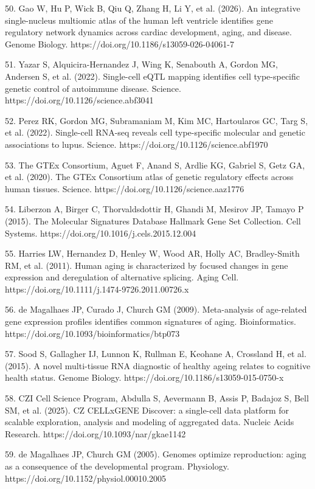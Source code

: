 \documentclass[11pt]{article}
\begin{document}
50. Gao W, Hu P, Wick B, Qiu Q, Zhang H, Li Y, et al. (2026). An integrative single-nucleus multiomic atlas of the human left ventricle identifies gene regulatory network dynamics across cardiac development, aging, and disease. Genome Biology. https://doi.org/10.1186/s13059-026-04061-7

51. Yazar S, Alquicira-Hernandez J, Wing K, Senabouth A, Gordon MG, Andersen S, et al. (2022). Single-cell eQTL mapping identifies cell type-specific genetic control of autoimmune disease. Science. https://doi.org/10.1126/science.abf3041

52. Perez RK, Gordon MG, Subramaniam M, Kim MC, Hartoularos GC, Targ S, et al. (2022). Single-cell RNA-seq reveals cell type-specific molecular and genetic associations to lupus. Science. https://doi.org/10.1126/science.abf1970

53. The GTEx Consortium, Aguet F, Anand S, Ardlie KG, Gabriel S, Getz GA, et al. (2020). The GTEx Consortium atlas of genetic regulatory effects across human tissues. Science. https://doi.org/10.1126/science.aaz1776

54. Liberzon A, Birger C, Thorvaldsdottir H, Ghandi M, Mesirov JP, Tamayo P (2015). The Molecular Signatures Database Hallmark Gene Set Collection. Cell Systems. https://doi.org/10.1016/j.cels.2015.12.004

55. Harries LW, Hernandez D, Henley W, Wood AR, Holly AC, Bradley-Smith RM, et al. (2011). Human aging is characterized by focused changes in gene expression and deregulation of alternative splicing. Aging Cell. https://doi.org/10.1111/j.1474-9726.2011.00726.x

56. de Magalhaes JP, Curado J, Church GM (2009). Meta-analysis of age-related gene expression profiles identifies common signatures of aging. Bioinformatics. https://doi.org/10.1093/bioinformatics/btp073

57. Sood S, Gallagher IJ, Lunnon K, Rullman E, Keohane A, Crossland H, et al. (2015). A novel multi-tissue RNA diagnostic of healthy ageing relates to cognitive health status. Genome Biology. https://doi.org/10.1186/s13059-015-0750-x

58. CZI Cell Science Program, Abdulla S, Aevermann B, Assis P, Badajoz S, Bell SM, et al. (2025). CZ CELLxGENE Discover: a single-cell data platform for scalable exploration, analysis and modeling of aggregated data. Nucleic Acids Research. https://doi.org/10.1093/nar/gkae1142

59. de Magalhaes JP, Church GM (2005). Genomes optimize reproduction: aging as a consequence of the developmental program. Physiology. https://doi.org/10.1152/physiol.00010.2005
\end{document}
